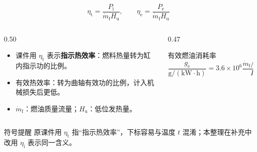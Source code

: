 \begin{frame}[t,shrink]{}
$$
\eta_{\mathrm{t}}=\frac{P_{\mathrm{i}}}{\dot m_{\mathrm{f}}H_{\mathrm{u}}},
\qquad
\eta_{\mathrm{e}}=\frac{P_{\mathrm{e}}}{\dot m_{\mathrm{f}}H_{\mathrm{u}}}
$$
\begin{columns}[T,onlytextwidth]
\begin{column}{0.50\textwidth}
  \begin{itemize}
    \item 课件用 \(\eta_{\mathrm{t}}\) 表示\textbf{指示热效率}：燃料热量转为缸内指示功的比例。
    \item 有效热效率：转为曲轴有效功的比例，计入机械损失后更低。
    \item \(\dot m_{\mathrm{f}}\)：燃油质量流量；\(H_{\mathrm{u}}\)：低位发热量。
  \end{itemize}
\end{column}
\begin{column}{0.47\textwidth}
  \begin{keybox}{有效燃油消耗率}
  \small
  $$
  \frac{g_{\mathrm{e}}}{\mathrm{g/(kW\cdot h)}}
  =3.6\times10^6
  \frac{\dot m_{\mathrm{f}}/\mathrm{(kg/s)}}{P_{\mathrm{e}}/\mathrm{kW}}
  $$
  \end{keybox}
\end{column}
\end{columns}
\vspace{0.5mm}
\begin{amberbox}{符号提醒}
\small 原课件用 \(\eta_{\mathrm{t}}\) 指“指示热效率”，下标容易与温度 \(t\) 混淆；本整理在补充中改用 \(\eta_{\mathrm{i}}\) 表示同一含义。
\end{amberbox}
\end{frame}

